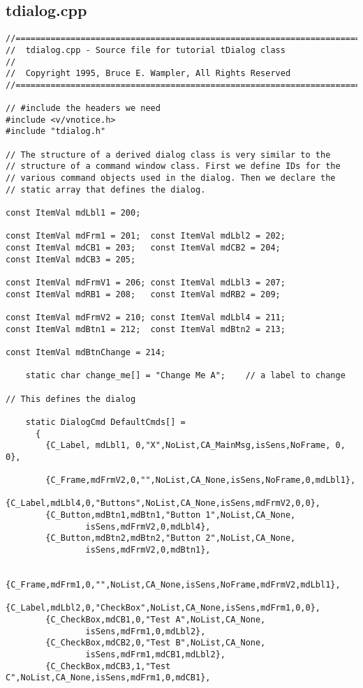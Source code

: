 \subsection*{tdialog.cpp}

%
\footnotesize
\begin{verbatim}
//========================================================================
//  tdialog.cpp - Source file for tutorial tDialog class
//
//  Copyright 1995, Bruce E. Wampler, All Rights Reserved
//========================================================================

// #include the headers we need
#include <v/vnotice.h>
#include "tdialog.h"

// The structure of a derived dialog class is very similar to the
// structure of a command window class. First we define IDs for the
// various command objects used in the dialog. Then we declare the
// static array that defines the dialog.

const ItemVal mdLbl1 = 200;

const ItemVal mdFrm1 = 201;  const ItemVal mdLbl2 = 202;
const ItemVal mdCB1 = 203;   const ItemVal mdCB2 = 204;
const ItemVal mdCB3 = 205;

const ItemVal mdFrmV1 = 206; const ItemVal mdLbl3 = 207;
const ItemVal mdRB1 = 208;   const ItemVal mdRB2 = 209;

const ItemVal mdFrmV2 = 210; const ItemVal mdLbl4 = 211;
const ItemVal mdBtn1 = 212;  const ItemVal mdBtn2 = 213;

const ItemVal mdBtnChange = 214;

    static char change_me[] = "Change Me A";    // a label to change

// This defines the dialog

    static DialogCmd DefaultCmds[] =
      {
        {C_Label, mdLbl1, 0,"X",NoList,CA_MainMsg,isSens,NoFrame, 0, 0},

        {C_Frame,mdFrmV2,0,"",NoList,CA_None,isSens,NoFrame,0,mdLbl1},
        {C_Label,mdLbl4,0,"Buttons",NoList,CA_None,isSens,mdFrmV2,0,0},
        {C_Button,mdBtn1,mdBtn1,"Button 1",NoList,CA_None,
                isSens,mdFrmV2,0,mdLbl4},
        {C_Button,mdBtn2,mdBtn2,"Button 2",NoList,CA_None,
                isSens,mdFrmV2,0,mdBtn1},

        {C_Frame,mdFrm1,0,"",NoList,CA_None,isSens,NoFrame,mdFrmV2,mdLbl1},
        {C_Label,mdLbl2,0,"CheckBox",NoList,CA_None,isSens,mdFrm1,0,0},
        {C_CheckBox,mdCB1,0,"Test A",NoList,CA_None,
                isSens,mdFrm1,0,mdLbl2},
        {C_CheckBox,mdCB2,0,"Test B",NoList,CA_None,
                isSens,mdFrm1,mdCB1,mdLbl2},
        {C_CheckBox,mdCB3,1,"Test C",NoList,CA_None,isSens,mdFrm1,0,mdCB1},


\end{verbatim}
